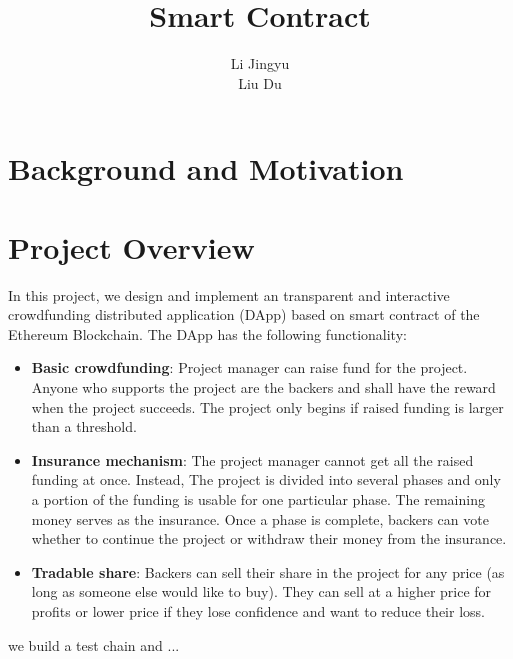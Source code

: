 \documentclass{article}
\title{Smart Contract }
\author{Li Jingyu\quad 517030910318\\Liu Du\quad 517030910346}
\begin{document}
\maketitle

\newcommand{\vecb}[2]{\boldsymbol{#1}^{(#2)}}
\newcommand{\code}[1]{{\ttfamily #1}}

\tableofcontents

\section{Background and Motivation}

\section{Project Overview}
\label{sec:proj}
In this project, we design and implement an transparent and interactive crowdfunding distributed application (DApp) based on smart contract of the Ethereum Blockchain. The DApp has the following functionality:
\begin{itemize}
    \item \textbf{Basic crowdfunding}: Project manager can raise fund for the project. Anyone who supports the project are the backers and shall have the reward when the project succeeds. The project only begins if raised funding is larger than a threshold.
    \item \textbf{Insurance mechanism}: The project manager cannot get all the raised funding at once. Instead, The project is divided into several phases and only a portion of the funding is usable for one particular phase. The remaining money serves as the insurance. Once a phase is complete, backers can vote whether to continue the project or withdraw their money from the insurance.
    \item \textbf{Tradable share}: Backers can sell their share in the project for any price (as long as someone else would like to buy). They can sell at a higher price for profits or lower price if they lose confidence and want to reduce their loss.
\end{itemize}

we build a test chain and ...

\end{document}
